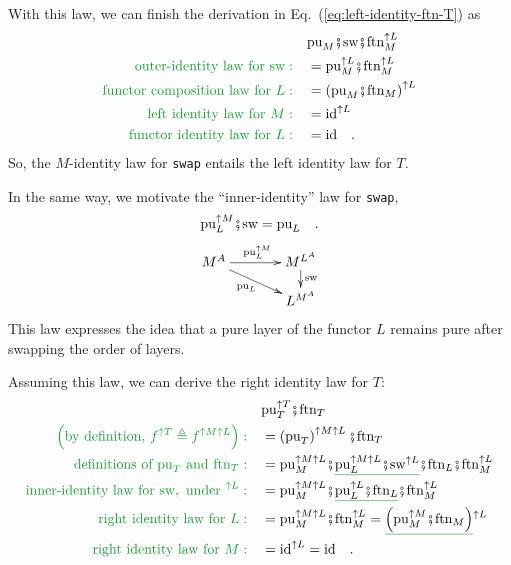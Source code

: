 With this law, we can finish the derivation in Eq.~(\ref{eq:left-identity-ftn-T})
as
\begin{align*}
 & \text{pu}_{M}\bef\text{sw}\bef\text{ftn}_{M}^{\uparrow L}\\
{\color{greenunder}\text{outer-identity law for }\text{sw}:}\quad & =\text{pu}_{M}^{\uparrow L}\bef\text{ftn}_{M}^{\uparrow L}\\
{\color{greenunder}\text{functor composition law for }L:}\quad & =\left(\text{pu}_{M}\bef\text{ftn}_{M}\right)^{\uparrow L}\\
{\color{greenunder}\text{left identity law for }M:}\quad & =\text{id}^{\uparrow L}\\
{\color{greenunder}\text{functor identity law for }L:}\quad & =\text{id}\quad.
\end{align*}
So, the $M$-identity law for \texttt{swap} entails the left identity
law for $T$.

In the same way, we motivate the ``inner-identity'' law for \texttt{swap},
\begin{equation}
\text{pu}_{L}^{\uparrow M}\bef\text{sw}=\text{pu}_{L}\quad.\label{eq:swap-law-2-L-identity}
\end{equation}
\[
\xymatrix{\xyScaleY{1pc}\xyScaleX{3pc}M^{A}\ar[r]\sp(0.5){\text{pu}_{L}^{\uparrow M}}\ar[rd]\sb(0.45){\text{pu}_{L}} & M^{L^{A}}\ar[d]\sp(0.4){\text{sw}}\\
 & L^{M^{A}}
}
\]
This law expresses the idea that a pure layer of the functor $L$
remains pure after swapping the order of layers.

Assuming this law, we can derive the right identity law for $T$:
\begin{align*}
 & \text{pu}_{T}^{\uparrow T}\bef\text{ftn}_{T}\\
{\color{greenunder}\left(\text{by definition, }f^{\uparrow T}\triangleq f^{\uparrow M\uparrow L}\right):}\quad & =\left(\text{pu}_{T}\right)^{\uparrow M\uparrow L}\bef\text{ftn}_{T}\\
{\color{greenunder}\text{definitions of }\text{pu}_{T}\text{ and }\text{ftn}_{T}:}\quad & =\text{pu}_{M}^{\uparrow M\uparrow L}\bef\gunderline{\text{pu}_{L}^{\uparrow M\uparrow L}\bef\text{sw}^{\uparrow L}}\bef\text{ftn}_{L}\bef\text{ftn}_{M}^{\uparrow L}\\
{\color{greenunder}\text{inner-identity law for }\text{sw},\text{ under }^{\uparrow L}:}\quad & =\text{pu}_{M}^{\uparrow M\uparrow L}\bef\gunderline{\text{pu}_{L}^{\uparrow L}\bef\text{ftn}_{L}}\bef\text{ftn}_{M}^{\uparrow L}\\
{\color{greenunder}\text{right identity law for }L:}\quad & =\text{pu}_{M}^{\uparrow M\uparrow L}\bef\text{ftn}_{M}^{\uparrow L}=\gunderline{\left(\text{pu}_{M}^{\uparrow M}\bef\text{ftn}_{M}\right)}^{\uparrow L}\\
{\color{greenunder}\text{right identity law for }M:}\quad & =\text{id}^{\uparrow L}=\text{id}\quad.
\end{align*}

